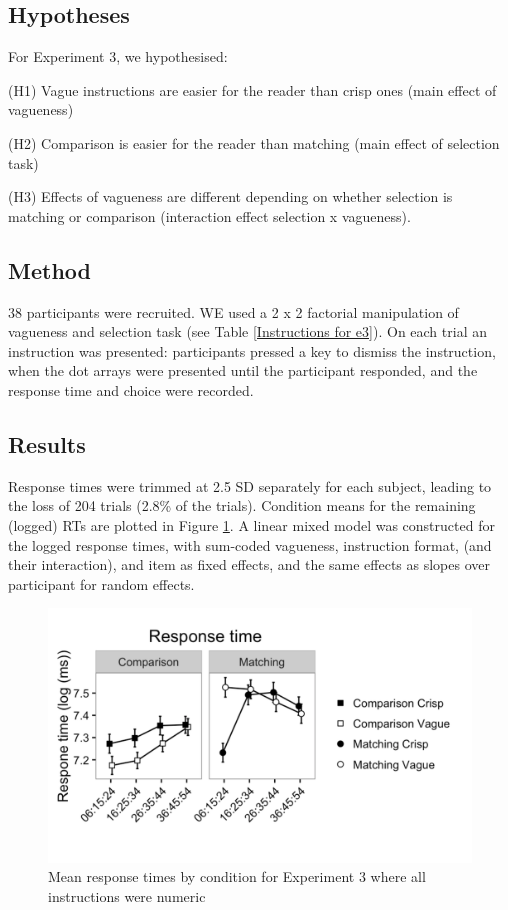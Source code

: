 \documentclass[%
man,		%
floatsintext,%
apacite%
]{apa6}
\begin{document}
\subsection{Hypotheses} %
\noindent For Experiment 3, we hypothesised:
{\small
\begin{APAenumerate}
	\item [(H1)] Vague instructions are easier for the reader than crisp ones (main effect of vagueness)
	\item [(H2)] Comparison is easier for the reader than matching (main effect of selection task)
	\item [(H3)] Effects of vagueness are different depending on whether selection is matching or comparison (interaction effect selection x vagueness).
\end{APAenumerate}
}

\subsection{Method} %

38 participants were recruited. WE used a 2 x 2 factorial manipulation of vagueness and selection task (see Table \ref{Instructions for e3}).
On each trial an instruction was presented: participants pressed a key to dismiss the instruction, when the dot arrays were presented until the participant responded, and the response time and choice were recorded.

\subsection{Results} %

Response times were trimmed at 2.5 SD separately for each subject, leading to the loss of 204 trials (2.8\% of the trials).
Condition means for the remaining (logged) RTs are plotted in Figure \ref{resultse3}.
A linear mixed model was constructed for the logged response times, 
with sum-coded vagueness, instruction format, (and their interaction), and item as fixed effects, and the same effects as slopes over participant for random effects.

\begin{figure}[htbp]
\centering
\includegraphics[trim = 0mm 30mm 0mm 10mm, clip, width=.75\textwidth]{images/rtplote3}
\caption{Mean response times by condition for Experiment 3 where all instructions were numeric}
\label{resultse3}
\end{figure}
\end{document}

